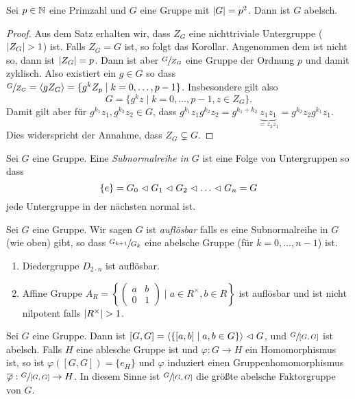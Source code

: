 \begin{corollary}
	Sei $p \in \mathbb{N}$ eine Primzahl und $G$ eine Gruppe mit $\abs{G} = p^2$.
	Dann ist $G$ abelsch.
\end{corollary}

\begin{proof}
	Aus dem Satz erhalten wir, dass $Z_{G}$ eine nichttriviale Untergruppe ($\abs{Z_{G}} > 1$) ist.
	Falls $Z_{G} = G$ ist, so folgt das Korollar.
	Angenommen dem ist nicht so, dann ist $\abs{Z_{G}} = p$.
	Dann ist aber $\sfrac{G}{Z_{G}}$ eine Gruppe der Ordnung $p$ und damit zyklisch.
	Also existiert ein $g \in G$ so dass $\sfrac{G}{Z_{G}} =  \left< g Z_{G} \right> = \{g^{k} Z_{p} \mid k = 0,\ldots,p-1\} $.
	Insbesondere gilt also
	\[
	G = \{g^{k} z \mid k = 0,\ldots,p-1, z \in Z_{G}\} 
	.\]
	Damit gilt aber für $g^{k_1} z_1, g^{k_2} z_2 \in G$, dass $g^{k_1} z_1 g^{k_2}z_2 = g^{k_1 + k_2} \underbrace{z_1 z_1}_{= z_2 z_1} = g^{k_2} z_2 g^{k_1} z_1$.
	Dies widerspricht der Annahme, dass $Z_{G} \subsetneq G$.
\end{proof}

\begin{definition}
	Sei $G$ eine Gruppe. Eine \emph{Subnormalreihe in $G$} ist eine Folge von Untergruppen so dass
	 \[
		 \{e\} = G_0 \vartriangleleft G_1 \vartriangleleft G_2 \vartriangleleft \ldots \vartriangleleft G_{n} = G
	\] 
	jede Untergruppe in der nächsten normal ist.
\end{definition}

\begin{definition}
	Sei $G$ eine Gruppe. Wir sagen $G$ ist \emph{auflösbar} falls es eine Subnormalreihe in $G$ (wie oben) gibt, so dass
	$\sfrac{G_{k+1}}{G_{k}}$ eine abelsche Gruppe (für $k = 0, \ldots, n-1$) ist.
\end{definition}

\begin{eg}
	\begin{enumerate}
		\item Diedergruppe $D_{2\cdot n}$ ist auflösbar.
		\item Affine Gruppe $A_{R} = \left\{\begin{pmatrix} 
					a & b\\ 0 & 1
		\end{pmatrix} \mid a \in R^{\times}, b \in R\right\} $ ist auflösbar und ist nicht nilpotent falls $\abs{R^{\times}} > 1$.
	\end{enumerate}
\end{eg}

\begin{proposition}
	Sei $G$ eine Gruppe. Dann ist $[G,G] = \left< \{ [a,b] \mid a,b \in G \} \right> \vartriangleleft G$, und $\sfrac{G}{[G,G]}$ ist abelsch.
	Falls $H$ eine ablesche Gruppe ist und $\varphi: G \to H$ ein Homomorphismus ist, so ist $\varphi([G,G]) = \{e_{H}\}$
	und $\varphi$ induziert einen Gruppenhomomorphismus $\overline{\varphi}: \sfrac{G}{[G,G]} \to H$.
	In diesem Sinne ist $\sfrac{G}{[G,G]}$ die größte abelsche Faktorgruppe von $G$.
\end{proposition}

